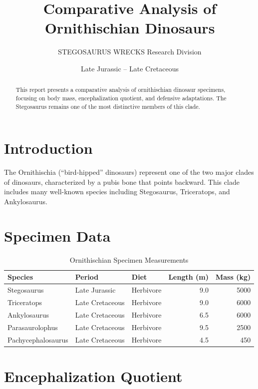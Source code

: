 \documentclass[12pt]{article}
\title{Comparative Analysis of Ornithischian Dinosaurs}
\author{STEGOSAURUS WRECKS Research Division}
\date{Late Jurassic -- Late Cretaceous}
\begin{document}
\maketitle


\begin{abstract}
This report presents a comparative analysis of ornithischian dinosaur specimens,
focusing on body mass, encephalization quotient, and defensive adaptations.
The Stegosaurus remains one of the most distinctive members of this clade.
\end{abstract}

\section{Introduction}

The Ornithischia (``bird-hipped'' dinosaurs) represent one of the two major
clades of dinosaurs, characterized by a pubis bone that points backward.
This clade includes many well-known species including Stegosaurus,
Triceratops, and Ankylosaurus.


\section{Specimen Data}

\begin{table}[h]
\centering
\caption{Ornithischian Specimen Measurements}
\begin{tabular}{lllrr}
\toprule
\textbf{Species} & \textbf{Period} & \textbf{Diet} & \textbf{Length (m)} & \textbf{Mass (kg)} \\
\midrule
Stegosaurus    & Late Jurassic    & Herbivore &  9.0 &  5000 \\
Triceratops    & Late Cretaceous  & Herbivore &  9.0 &  6000 \\
Ankylosaurus   & Late Cretaceous  & Herbivore &  6.5 &  6000 \\
Parasaurolophus & Late Cretaceous & Herbivore &  9.5 &  2500 \\
Pachycephalosaurus & Late Cretaceous & Herbivore & 4.5 & 450 \\
\bottomrule
\end{tabular}
\end{table}

\section{Encephalization Quotient}
\end{document}

